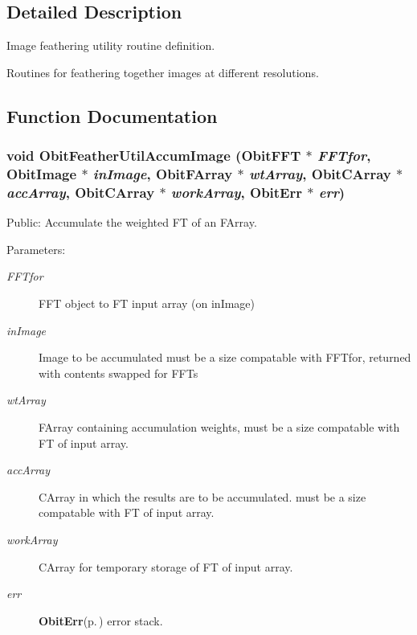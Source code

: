 \subsection{Detailed Description}
Image feathering utility routine definition. 

Routines for feathering together images at different resolutions.

\subsection{Function Documentation}
\subsubsection{\setlength{\rightskip}{0pt plus 5cm}void Obit\-Feather\-Util\-Accum\-Image ({\bf Obit\-FFT} $\ast$ {\em FFTfor}, {\bf Obit\-Image} $\ast$ {\em in\-Image}, {\bf Obit\-FArray} $\ast$ {\em wt\-Array}, {\bf Obit\-CArray} $\ast$ {\em acc\-Array}, {\bf Obit\-CArray} $\ast$ {\em work\-Array}, {\bf Obit\-Err} $\ast$ {\em err})}\label{ObitFeatherUtil_8h_a9}


Public: Accumulate the weighted FT of an FArray. 

\begin{Desc}
\item[Parameters:]
\begin{description}
\item[{\em FFTfor}]FFT object to FT input array (on in\-Image) \item[{\em in\-Image}]Image to be accumulated must be a size compatable with FFTfor, returned with contents swapped for FFTs \item[{\em wt\-Array}]FArray containing accumulation weights, must be a size compatable with FT of input array. \item[{\em acc\-Array}]CArray in which the results are to be accumulated. must be a size compatable with FT of input array. \item[{\em work\-Array}]CArray for temporary storage of FT of input array. \item[{\em err}]{\bf Obit\-Err}{\rm (p.\,\pageref{structObitErr})} error stack. \end{description}
\end{Desc}

